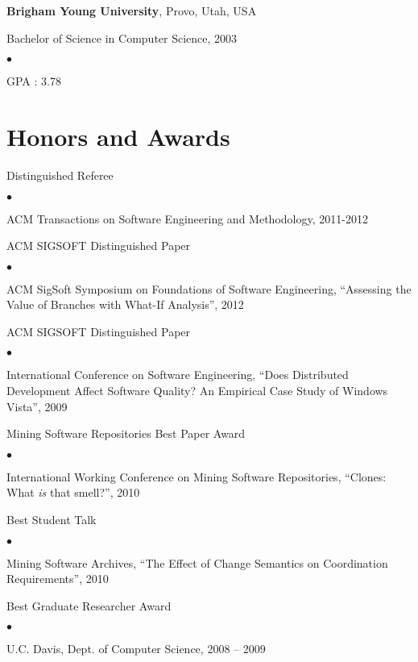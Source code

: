 \documentclass[margin,line,article,letterpaper]{res}
\newenvironment{list1}{
  \begin{list}{}{%
      \setlength{\itemsep}{0in}
      \setlength{\parsep}{0in} \setlength{\parskip}{0in}
      \setlength{\topsep}{0in} \setlength{\partopsep}{0in} 
      \setlength{\leftmargin}{0.17in}}}{\end{list}}
\newenvironment{list2}{
  \begin{list}{$\bullet$}{%
      \setlength{\itemsep}{0in}
      \setlength{\parsep}{0in} \setlength{\parskip}{0in}
      \setlength{\topsep}{0in} \setlength{\partopsep}{0in} 
      \setlength{\leftmargin}{0.2in}}}{\end{list}}
\begin{document}
\begin{resume}
\textbf{Brigham Young University}, Provo, Utah, USA
\begin{list1}
\item Bachelor of Science in Computer Science, 2003
\begin{list2}
\vspace*{.05in}
\item GPA : 3.78
\end{list2}
\end{list1}


\section{Honors and Awards} 

Distinguished Referee
\begin{list2}
\item ACM Transactions on Software Engineering and Methodology, 2011-2012
\end{list2}

ACM SIGSOFT Distinguished Paper
\begin{list2}
\item ACM SigSoft Symposium on Foundations of Software Engineering, ``Assessing the Value of Branches with What-If Analysis'', 2012
\end{list2}

ACM SIGSOFT Distinguished Paper
\begin{list2}
\item International Conference on Software Engineering, ``Does Distributed Development
Affect Software Quality?  An Empirical Case Study of Windows Vista'', 2009
\end{list2}

Mining Software Repositories Best Paper Award
\begin{list2}
\item International Working Conference on Mining Software Repositories, ``Clones: What \emph{is} that smell?'', 2010
\end{list2}

Best Student Talk
\begin{list2}
\item Mining Software Archives, ``The Effect of Change Semantics on Coordination Requirements'', 2010
\end{list2}

Best Graduate Researcher Award
\begin{list2}
\item U.C. Davis, Dept. of Computer Science, 2008 -- 2009
\end{list2}



\end{resume}
\end{document}
